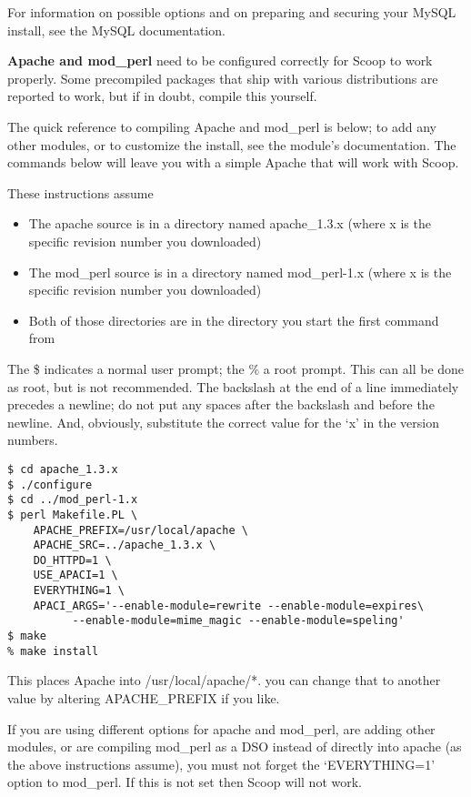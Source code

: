 For information on possible options and on preparing and securing your MySQL install, see the MySQL documentation.

{\bf Apache and mod\_perl} need to be configured correctly for Scoop to work properly.  Some precompiled packages that ship with various distributions are reported to work, but if in doubt, compile this yourself.

The quick reference to compiling Apache and mod\_perl is below; to add any other modules, or to customize the install, see the module's documentation.  The commands below will leave you with a simple Apache that will work with Scoop.

These instructions assume
\begin{itemize}
\item The apache source is in a directory named apache\_1.3.x (where x is the specific revision number you downloaded)
\item The mod\_perl source is in a directory named mod\_perl-1.x (where x is the specific revision number you downloaded)
\item Both of those directories are in the directory you start the first command from
\end{itemize}

The \$ indicates a normal user prompt; the \% a root prompt.  This can all be done as root, but is not recommended.  The backslash at the end of a line immediately precedes a newline; do not put any spaces after the backslash and before the newline. And, obviously, substitute the correct value for the `x' in the version numbers.

\begin{verbatim}
$ cd apache_1.3.x
$ ./configure
$ cd ../mod_perl-1.x
$ perl Makefile.PL \
    APACHE_PREFIX=/usr/local/apache \
    APACHE_SRC=../apache_1.3.x \
    DO_HTTPD=1 \
    USE_APACI=1 \
    EVERYTHING=1 \
    APACI_ARGS='--enable-module=rewrite --enable-module=expires\
          --enable-module=mime_magic --enable-module=speling'
$ make
% make install
\end{verbatim}

This places Apache into /usr/local/apache/*. you can change that to another value by altering APACHE\_PREFIX if you like.

If you are using different options for apache and mod\_perl, are adding other modules, or are compiling mod\_perl as a DSO instead of directly into apache (as the above instructions assume), you must not forget the `EVERYTHING=1' option to mod\_perl. If this is not set then Scoop will not work.

